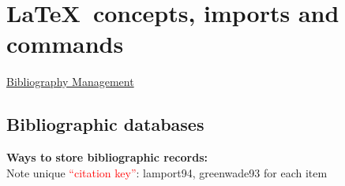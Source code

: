 \documentclass[a4paper,11pt]{article}
\begin{document}
\section{\LaTeX~concepts, imports and commands}

\href{https://en.wikibooks.org/wiki/LaTeX/Bibliography_Management}{Bibliography Management}

\subsection{Bibliographic databases}
	
\textbf{Ways to store bibliographic records:}\\

Note unique \textcolor{red}{``citation key''}: lamport94, greenwade93 for each item 
\end{document}

